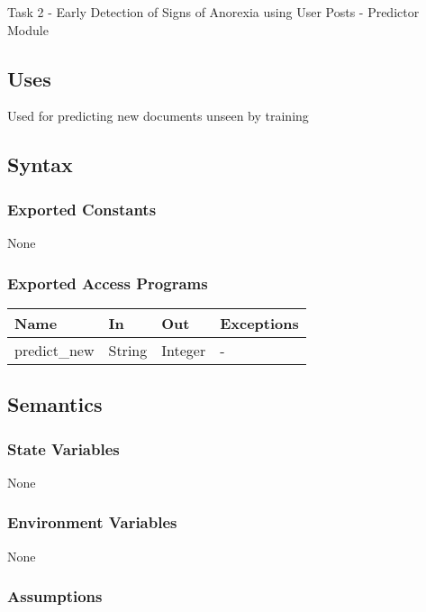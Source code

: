 \documentclass[12pt, titlepage]{article}
\begin{document}
Task 2 - Early Detection of Signs of Anorexia using User Posts - Predictor Module

\subsection{Uses}

Used for predicting new documents unseen by training

\subsection{Syntax}

\subsubsection{Exported Constants}

None

\subsubsection{Exported Access Programs}

\begin{center}
\begin{tabular}{p{3.5cm} p{4.5cm} p{3cm} p{2cm}}
\hline
\textbf{Name} & \textbf{In} & \textbf{Out} & \textbf{Exceptions} \\
\hline
predict\_new & String & Integer & - \\
\hline
\end{tabular}
\end{center}

\subsection{Semantics}

\subsubsection{State Variables}

None

\subsubsection{Environment Variables}

None

\subsubsection{Assumptions}
\end{document}
